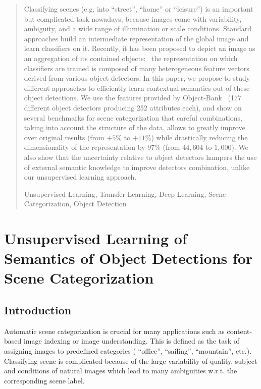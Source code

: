 \documentclass[runningheads,a4paper]{llncs}
\newcommand{\keywords}[1]{\par\addvspace\baselineskip
\noindent\keywordname\enspace\ignorespaces#1}
\begin{document}
\maketitle


\begin{abstract} Classifying scenes (e.g. into ``street'', ``home'' or
``leisure'') is an important but complicated task nowadays, because images come
with variability, ambiguity, and a wide range of illumination or scale
conditions.
  Standard approaches build an intermediate representation of the global image
  and learn classifiers on it. %
  Recently, it has been proposed to depict an image as an aggregation of its
  contained objects:~ the representation on which classifiers are trained is
  composed of many heterogeneous feature vectors derived from various object
  detectors.
  In this paper, we propose to study different approaches to efficiently learn
  contextual semantics out of these object detections.
  We use the features provided by Object-Bank~\cite{LiJiaLi10} (177 different
  object detectors producing 252 attributes each), and show on several
  benchmarks for scene categorization that careful combinations, taking into
  account the structure of the data, allows to greatly improve over original
  results (from $+5\%$ to $+11\%$)
  while drastically reducing the dimensionality of the %
      representation by 97\% (from $44,604$ to $1,000$).
  We also show that the uncertainty relative to object detectors hampers the
  use of external semantic knowledge to improve detectors combination, unlike
  our unsupervised learning approach.

\keywords{Unsupervised Learning, Transfer Learning, Deep Learning, Scene Categorization, Object Detection}
\end{abstract}
\fi

\chapter{Unsupervised Learning of Semantics of Object Detections for Scene Categorization}
\section{Introduction}


Automatic scene categorization is crucial for many applications such
as content-based image indexing \cite{Smeulders:2000} or image
understanding.
%
This is defined as the task of assigning images to predefined
categories ( ``office'', ``sailing'', ``mountain'', etc.).
%
Classifying scene is complicated because of the large variability of
quality, subject and conditions of natural images which lead to many
ambiguities w.r.t. the corresponding scene label.
\end{document}
